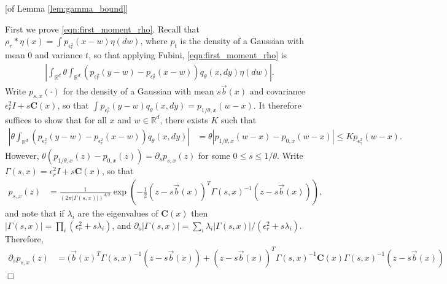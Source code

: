 \documentclass[12pt]{article}
\newenvironment {proof}{{\noindent\bf Proof }}{\hfill $\Box$ \medskip}
\newcommand{\IR}{\mathbb R}
\newcommand{\meanq}{\vec b}    %
\newcommand{\covq}{\mathbf{C}}     %
\newcommand{\kernel}{\rho}  %
\newcommand{\smooth}[1]{\kernel_{#1} \! * \!}  %
\numberwithin{equation}{section}
\begin{document}
\begin{proof}[of Lemma \ref{lem:gamma_bound}]

    First we prove \eqref{eqn:first_moment_rho}.
    Recall that $\smooth{r} \eta(x) = \int p_{\epsilon^2_r}(x - w) \eta(dw)$,
    where $p_t$ is the density of a Gaussian with mean 0 and variance $t$,
    so that applying Fubini, \eqref{eqn:first_moment_rho} is
    \begin{align*}
        \left|
        \int_{\IR^d}
        \theta
            \int_{\IR^d}
                ( p_{\epsilon_r^2}(y - w) - p_{\epsilon_r^2}(x - w) )
            q_\theta(x, dy)
        \eta(dw)
        \right| .
    \end{align*}
    Write $p_{s, x}(\cdot)$ for the density of a Gaussian
    with mean $s \meanq(x)$ and covariance $\epsilon_r^2 I + s \covq(x)$,
    so that $\int p_{\epsilon_r^2}(y - w) q_\theta(x, dy) = p_{1/\theta, x}(w-x)$.
    It therefore suffices to show that for all $x$ and $w \in \IR^d$,
    there exists $K$ such that
    \begin{align*}
        \left|
        \theta
            \int_{\IR^d}
                ( p_{\epsilon_r^2}(y-w) - p_{\epsilon_r^2}(x-w) )
            q_\theta(x, dy)
        \right|
        &=
        \theta \left|
            p_{1/\theta, x}(w-x) - p_{0, x}(w-x)
        \right|
        \le
        K p_{\epsilon^2_\gamma}(w-x) .
    \end{align*}
    However,
    $\theta( p_{1/\theta, x}(z) - p_{0, x}(z) )
    = \partial_s p_{s, x}(z)$ for some $0 \le s \le 1/\theta$.
    Write $\Gamma(s,x) = \epsilon_r^2 I + s \covq(x)$,
    so that
    \begin{align*}
        p_{s, x}(z)
        &=
        \frac{1}{\left(2 \pi |\Gamma(s,x)|\right)^{d/2}}
        \exp\left(
            -\frac{1}{2} (z - s\meanq(x))^T \Gamma(s,x)^{-1} (z - s\meanq(x))
        \right) ,
    \end{align*}
    and note that if $\lambda_i$ are the eigenvalues of $\covq(x)$
    then $|\Gamma(s, x)| = \prod_i (\epsilon_r^2 + s \lambda_i)$,
    and
    $\partial_s |\Gamma(s, x)| = \sum_i \lambda_i |\Gamma(s, x)| / (\epsilon_r^2 + s \lambda_i)$.
    Therefore,
    \begin{align*}
        \partial_s p_{s, x}(z)
        &=
        \bigg(
            \meanq(x)^T \Gamma(s,x)^{-1} (z - s \meanq(x))
            +
            (z - s \meanq(x))^T
            \Gamma(s,x)^{-1} \covq(x) \Gamma(s,x)^{-1}
            (z - s \meanq(x))
        \\ & \qquad \qquad \qquad {}

\end{align*}
\end{proof}
\end{document}
